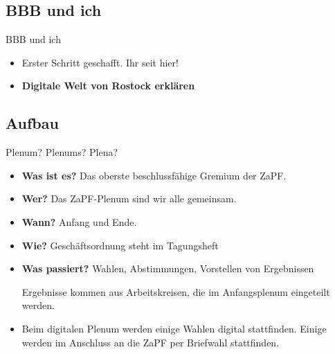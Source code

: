 \documentclass[compress,]{beamer}
\begin{document}

\subsection{BBB und ich}
\begin{frame}{BBB und ich}
  \begin{itemize}[<+->]
  \item Erster Schritt geschafft. Ihr seit hier!
  \item \textbf{Digitale Welt von Rostock erklären}
  \end{itemize}

\end{frame}


\subsection{Aufbau}

\begin{frame}{Plenum? Plenums? Plena?}

  \begin{itemize}[<+->]
  \item \textbf{Was ist es?} Das oberste beschlussfähige Gremium der ZaPF.
  \item \textbf{Wer?} Das ZaPF-Plenum sind wir alle gemeinsam.
  \item \textbf{Wann?} Anfang und Ende.
  \item \textbf{Wie?} Geschäftsordnung steht im Tagungsheft
  \item \textbf{Was passiert?} Wahlen, Abstimmungen, Vorstellen von Ergebnissen

    Ergebnisse kommen aus Arbeitskreisen, die im Anfangsplenum eingeteilt werden.
  \item Beim digitalen Plenum werden einige Wahlen digital stattfinden. Einige werden im Anschluss an die ZaPF per Briefwahl stattfinden.  
  \end{itemize}


\end{frame}
\end{document}
